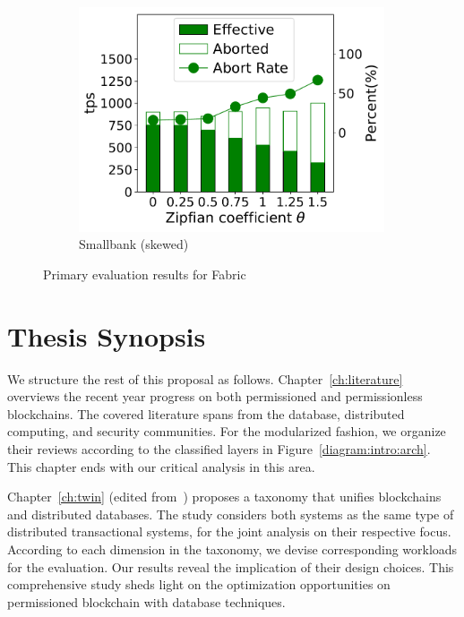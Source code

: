 \begin{figure}[tp]
\begin{subfigure}{0.30\textwidth}
      \includegraphics[width=0.99\textwidth]{chart/intro/smallbank_skew.pdf}
      \caption{Smallbank (skewed)}
      \label{chart:intro:basic:smallbank_skew}
    \end{subfigure}
    \caption{Primary evaluation results for Fabric }
    \label{chart:intro:basic}
\end{figure}

\section{Thesis Synopsis}
We structure the rest of this proposal as follows. Chapter~\ref{ch:literature} overviews the recent year progress on both permissioned and permissionless blockchains. The covered literature spans from the database, distributed computing, and security communities. For the modularized fashion, we organize their reviews according to the classified layers in Figure~\ref{diagram:intro:arch}. This chapter ends with our critical analysis in this area. 

Chapter~\ref{ch:twin} (edited from~\cite{ruan2019blockchains}) proposes a taxonomy that unifies blockchains and distributed databases. 
The study considers both systems as the same type of distributed transactional systems, for the joint analysis on their respective focus. 
According to each dimension in the taxonomy, we devise corresponding workloads for the evaluation. 
Our results reveal the implication of their design choices. 
This comprehensive study sheds light on the optimization opportunities on permissioned blockchain with database techniques. 

